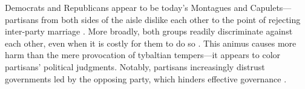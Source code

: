 \documentclass[12pt, letterpaper]{article}
\begin{document}
\begin{abstract}

\end{abstract}

\newpage
\doublespacing

\noindent Democrats and Republicans appear to be today's Montagues and Capulets---partisans from both sides of the aisle dislike each other to the point of rejecting inter-party marriage \citep[e.g.,][]{IyengarSoodLelkes2012, pew_polarization}. More broadly, both groups readily discriminate against each other, even when it is costly for them to do so \citep{IyengarWestwood2014, mcconnell2018economic}. This animus causes more harm than the mere provocation of tybaltian tempers---it appears to color partisans' political judgments. Notably, partisans increasingly distrust governments led by the opposing party, which hinders effective governance \citep{hetherington2015washington}.
\end{document}

